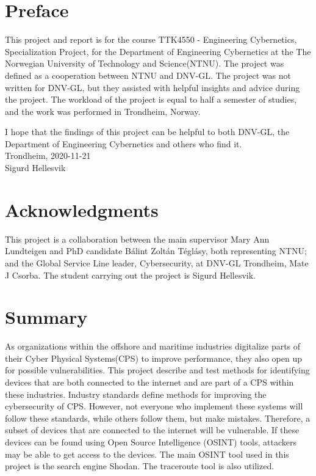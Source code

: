 \section*{Preface}
This project and report is for the course TTK4550 - Engineering Cybernetics, Specialization Project, for the Department of Engineering Cybernetics at the The Norwegian University of Technology and Science(NTNU). The project was defined as a cooperation between NTNU and DNV-GL. The project was not written for DNV-GL, but they assisted with helpful insights and advice during the project. The workload of the project is equal to half a semester of studies, and the work was performed in Trondheim, Norway.

I hope that the findings of this project can be helpful to both DNV-GL, the Department of Engineering Cybernetics and others who find it. 
\\
Trondheim, 2020-11-21
\\
Sigurd Hellesvik
\newpage

\section*{Acknowledgments} \label{sec:ack}
This project is a collaboration between the main supervisor Mary Ann Lundteigen and PhD candidate Bálint Zoltán Téglásy, both representing NTNU; and the Global Service Line leader, Cybersecurity, at DNV-GL Trondheim,  Mate J Csorba. The student carrying out the project is Sigurd Hellesvik.

\section*{Summary}

As organizations within the offshore and maritime industries digitalize parts of their Cyber Physical Systems(CPS) to improve performance, they also open up for possible vulnerabilities. This project describe and test methods for identifying devices that are both connected to the internet and are part of a CPS within these industries. 
Industry standards define methods for improving the cybersecurity of CPS. However, not everyone who implement these systems will follow these standards, while others follow them, but make mistakes. Therefore, a subset of devices that are connected to the internet will be vulnerable. If these devices can be found using Open Source Intelligence (OSINT) tools, attackers may be able to get access to the devices. 
The main OSINT tool used in this project is the search engine Shodan. The traceroute tool is also utilized.

